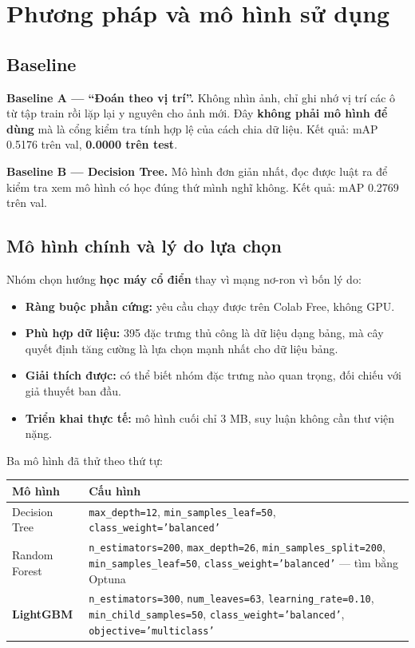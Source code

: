 \documentclass[12pt]{ai_conquer2026}
\begin{document}
\newpage
\section{Phương pháp và mô hình sử dụng}

\subsection{Baseline}

\textbf{Baseline A --- ``Đoán theo vị trí''.} Không nhìn ảnh, chỉ ghi nhớ vị trí các ô từ tập train rồi lặp lại y nguyên cho ảnh mới. Đây \textbf{không phải mô hình để dùng} mà là cổng kiểm tra tính hợp lệ của cách chia dữ liệu. Kết quả: mAP 0.5176 trên val, \textbf{0.0000 trên test}.

\textbf{Baseline B --- Decision Tree.} Mô hình đơn giản nhất, đọc được luật ra để kiểm tra xem mô hình có học đúng thứ mình nghĩ không. Kết quả: mAP 0.2769 trên val.

\subsection{Mô hình chính và lý do lựa chọn}

Nhóm chọn hướng \textbf{học máy cổ điển} thay vì mạng nơ-ron vì bốn lý do:

\begin{itemize}
\item \textbf{Ràng buộc phần cứng:} yêu cầu chạy được trên Colab Free, không GPU.
\item \textbf{Phù hợp dữ liệu:} 395 đặc trưng thủ công là dữ liệu dạng bảng, mà cây quyết định tăng cường là lựa chọn mạnh nhất cho dữ liệu bảng.
\item \textbf{Giải thích được:} có thể biết nhóm đặc trưng nào quan trọng, đối chiếu với giả thuyết ban đầu.
\item \textbf{Triển khai thực tế:} mô hình cuối chỉ 3 MB, suy luận không cần thư viện nặng.
\end{itemize}

Ba mô hình đã thử theo thứ tự:

\begin{center}
\begin{tabular}{|l|p{9.5cm}|}
\hline
\textbf{Mô hình} & \textbf{Cấu hình} \\
\hline
Decision Tree & \texttt{max\_depth=12}, \texttt{min\_samples\_leaf=50}, \texttt{class\_weight='balanced'} \\
\hline
Random Forest & \texttt{n\_estimators=200}, \texttt{max\_depth=26}, \texttt{min\_samples\_split=200}, \texttt{min\_samples\_leaf=50}, \texttt{class\_weight='balanced'} --- tìm bằng Optuna \\
\hline
\textbf{LightGBM} & \texttt{n\_estimators=300}, \texttt{num\_leaves=63}, \texttt{learning\_rate=0.10}, \texttt{min\_child\_samples=50}, \texttt{class\_weight='balanced'}, \texttt{objective='multiclass'} \\
\hline
\end{tabular}
\end{center}
\end{document}
